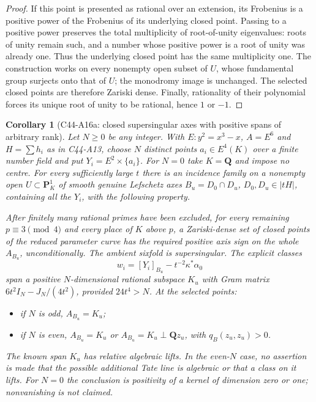 \documentclass[11pt]{article}
\newtheorem{corollary}[theorem]{Corollary}
\theoremstyle{remark}\newtheorem{remark}[theorem]{Remark}
\begin{document}
\begin{proof}
If this point is presented as rational over an extension,
its Frobenius is a positive power of the Frobenius of its
underlying closed point. Passing to a positive power
preserves the total multiplicity of root-of-unity
eigenvalues: roots of unity remain such, and a number
whose positive power is a root of unity was already one.
Thus the underlying closed point has the same multiplicity
one. The construction works on every nonempty open subset
of $U$, whose fundamental group surjects onto that of $U$;
the monodromy image is unchanged. The selected closed
points are therefore Zariski dense. Finally, rationality
of their polynomial forces its unique root of unity to
be rational, hence $1$ or $-1$.
\end{proof}

\begin{corollary}[C44-A16a: closed supersingular axes with positive spans of arbitrary rank]
Let $N\geq0$ be any integer. With $E:y^2=x^3-x$, $A=E^6$
and $H=\sum h_i$ as in C44-A13, choose $N$ distinct points
$a_i\in E^4(K)$ over a finite number field and put
$Y_i=E^2\times\{a_i\}$. For $N=0$ take $K=\mathbf Q$
and impose no centre. For every sufficiently large $t$
there is an incidence family on a nonempty open
$U\subset\mathbf P^1_K$ of smooth genuine Lefschetz
axes $B_u=D_0\cap D_u$, $D_0,D_u\in|tH|$, containing all
the $Y_i$, with the following property.

After finitely many rational primes have been excluded,
for every remaining $p\equiv3\pmod4$ and every place of
$K$ above $p$, a Zariski-dense set of closed points of the
reduced parameter curve has the required positive axis
sign on the \emph{whole} $A_{B_u}$, unconditionally. The
ambient sixfold is supersingular. The explicit classes
\[
   w_i=[Y_i]_{B_u}-t^{-2}\kappa^*\alpha_0
\]
span a positive $N$-dimensional rational subspace $K_u$
with Gram matrix $6t^2I_N-J_N/(4t^2)$, provided
$24t^4>N$. At the selected points:
\begin{itemize}
\item if $N$ is odd, $A_{B_u}=K_u$;
\item if $N$ is even, $A_{B_u}=K_u$ or
      $A_{B_u}=K_u\perp\mathbf Qz_u$, with $q_B(z_u,z_u)>0$.
\end{itemize}
The known span $K_u$ has relative algebraic lifts. In the
even-$N$ case, no assertion is made that the possible
additional Tate line is algebraic or that a class on it
lifts. For $N=0$ the conclusion is positivity of a kernel
of dimension zero or one; nonvanishing is not claimed.
\end{corollary}
\end{document}
